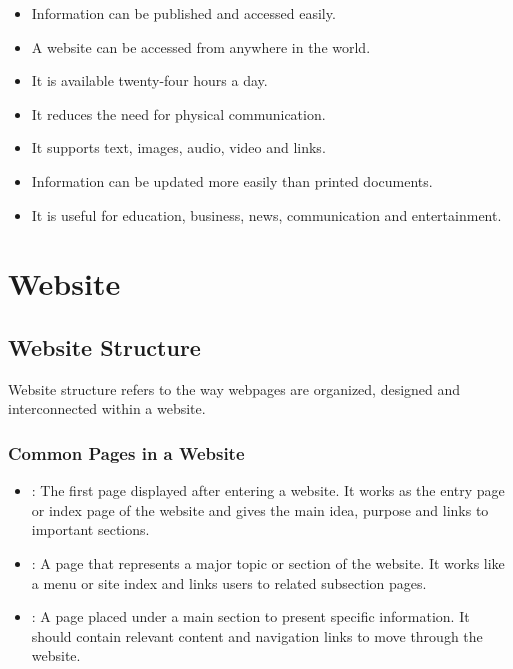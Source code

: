 \begin{itemize}
    \item Information can be published and accessed easily.
    \item A website can be accessed from anywhere in the world.
    \item It is available twenty-four hours a day.
    \item It reduces the need for physical communication.
    \item It supports text, images, audio, video and links.
    \item Information can be updated more easily than printed documents.
    \item It is useful for education, business, news, communication and entertainment.
\end{itemize}


\section{Website}

\subsection{Website Structure}

\begin{definitionbox}
Website structure refers to the way webpages are organized, designed and interconnected within a website.
\end{definitionbox}

\subsubsection{Common Pages in a Website}

\begin{itemize}
    \item {}: The first page displayed after entering a website. It works as the entry page or index page of the website and gives the main idea, purpose and links to important sections.
    
    \item {}: A page that represents a major topic or section of the website. It works like a menu or site index and links users to related subsection pages.
    
    \item {}: A page placed under a main section to present specific information. It should contain relevant content and navigation links to move through the website.
\end{itemize}

